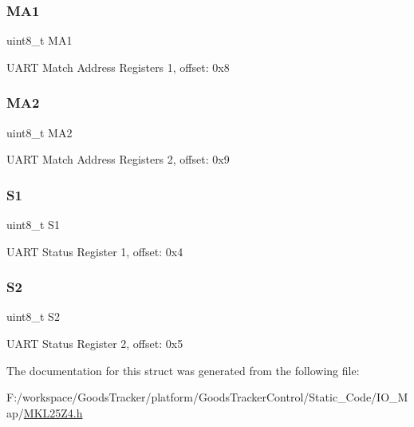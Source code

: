 \subsubsection{\texorpdfstring{M\+A1}{MA1}}
{\footnotesize\ttfamily uint8\+\_\+t M\+A1}

U\+A\+RT Match Address Registers 1, offset\+: 0x8 \mbox{\label{struct_u_a_r_t0___mem_map_adaf9bf1effbeb96d126fe9cf1bd0adb7}} 
\subsubsection{\texorpdfstring{M\+A2}{MA2}}
{\footnotesize\ttfamily uint8\+\_\+t M\+A2}

U\+A\+RT Match Address Registers 2, offset\+: 0x9 \mbox{\label{struct_u_a_r_t0___mem_map_a61370495fe05fc15ca074ec7a5c2d99f}} 
\subsubsection{\texorpdfstring{S1}{S1}}
{\footnotesize\ttfamily uint8\+\_\+t S1}

U\+A\+RT Status Register 1, offset\+: 0x4 \mbox{\label{struct_u_a_r_t0___mem_map_a7ff71460633a0ef4ba8d6a700d49b993}} 
\subsubsection{\texorpdfstring{S2}{S2}}
{\footnotesize\ttfamily uint8\+\_\+t S2}

U\+A\+RT Status Register 2, offset\+: 0x5 

The documentation for this struct was generated from the following file\+:\begin{DoxyCompactItemize}
\item 
F\+:/workspace/\+Goods\+Tracker/platform/\+Goods\+Tracker\+Control/\+Static\+\_\+\+Code/\+I\+O\+\_\+\+Map/\hyperlink{_m_k_l25_z4_8h}{M\+K\+L25\+Z4.\+h}\end{DoxyCompactItemize}
